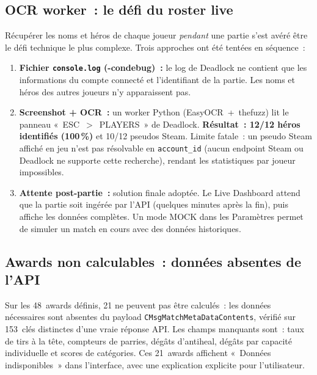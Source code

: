 \documentclass[12pt,a4paper]{article}
\begin{document}
\subsection{OCR worker~: le défi du roster live}

Récupérer les noms et héros de chaque joueur \textit{pendant} une partie
s'est avéré être le défi technique le plus complexe. Trois approches ont
été tentées en séquence~:

\begin{enumerate}
  \item \textbf{Fichier \texttt{console.log} (-condebug)~:} le log de
    Deadlock ne contient que les informations du compte connecté et
    l'identifiant de la partie. Les noms et héros des autres joueurs
    n'y apparaissent pas.

  \item \textbf{Screenshot + OCR~:} un worker Python (EasyOCR~+~thefuzz)
    lit le panneau «~ESC~$>$~PLAYERS~» de Deadlock.
    \textbf{Résultat~: 12/12 héros identifiés (100\,\%)} et
    10/12 pseudos Steam. Limite fatale~: un pseudo Steam affiché
    en jeu n'est pas résolvable en \texttt{account\_id} (aucun endpoint
    Steam ou Deadlock ne supporte cette recherche), rendant les
    statistiques par joueur impossibles.

  \item \textbf{Attente post-partie~:} solution finale adoptée. Le
    Live Dashboard attend que la partie soit ingérée par l'API
    (quelques minutes après la fin), puis affiche les données complètes.
    Un mode MOCK dans les Paramètres permet de simuler un match en cours
    avec des données historiques.
\end{enumerate}

\subsection{Awards non calculables~: données absentes de l'API}

Sur les 48~awards définis, 21 ne peuvent pas être calculés~: les données
nécessaires sont absentes du payload \texttt{CMsgMatchMetaDataContents},
vérifié sur 153~clés distinctes d'une vraie réponse API. Les champs
manquants sont~: taux de tirs à la tête, compteurs de parries, dégâts
d'antiheal, dégâts par capacité individuelle et scores de catégories.
Ces 21~awards affichent «~Données indisponibles~» dans l'interface, avec
une explication explicite pour l'utilisateur.

\end{document}
